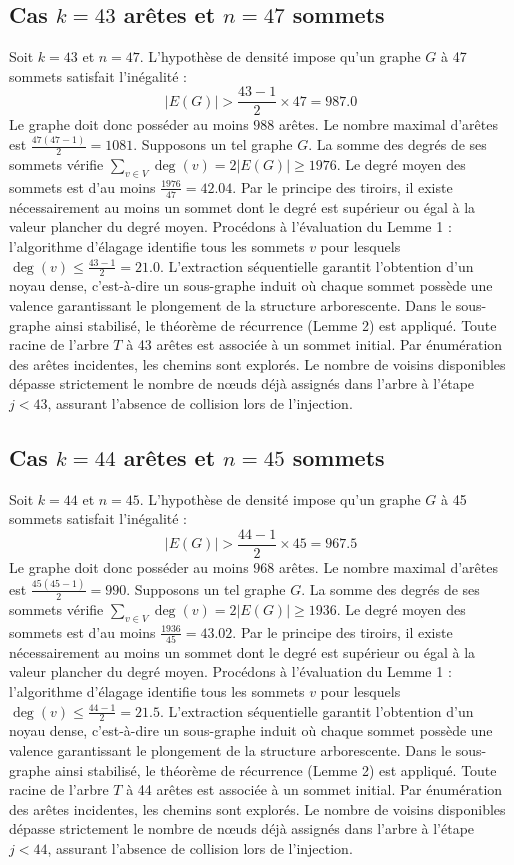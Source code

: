 \documentclass[12pt,a4paper]{article}
\begin{document}
\subsection{Cas $k = 43$ arêtes et $n = 47$ sommets}
Soit $k = 43$ et $n = 47$. L'hypothèse de densité impose qu'un graphe $G$ à 47 sommets satisfait l'inégalité :
$$ |E(G)| > \frac{43-1}{2} \times 47 = 987.0 $$
Le graphe doit donc posséder au moins $988$ arêtes. Le nombre maximal d'arêtes est $\frac{47(47-1)}{2} = 1081$.
Supposons un tel graphe $G$. La somme des degrés de ses sommets vérifie $\sum_{v \in V} \deg(v) = 2|E(G)| \geq 1976$.
Le degré moyen des sommets est d'au moins $\frac{1976}{47} = 42.04$.
Par le principe des tiroirs, il existe nécessairement au moins un sommet dont le degré est supérieur ou égal à la valeur plancher du degré moyen.
Procédons à l'évaluation du Lemme 1 : l'algorithme d'élagage identifie tous les sommets $v$ pour lesquels $\deg(v) \leq \frac{43-1}{2} = 21.0$.
L'extraction séquentielle garantit l'obtention d'un noyau dense, c'est-à-dire un sous-graphe induit où chaque sommet possède une valence garantissant le plongement de la structure arborescente.
Dans le sous-graphe ainsi stabilisé, le théorème de récurrence (Lemme 2) est appliqué. Toute racine de l'arbre $T$ à 43 arêtes est associée à un sommet initial. Par énumération des arêtes incidentes, les chemins sont explorés. Le nombre de voisins disponibles dépasse strictement le nombre de nœuds déjà assignés dans l'arbre à l'étape $j < 43$, assurant l'absence de collision lors de l'injection.

\subsection{Cas $k = 44$ arêtes et $n = 45$ sommets}
Soit $k = 44$ et $n = 45$. L'hypothèse de densité impose qu'un graphe $G$ à 45 sommets satisfait l'inégalité :
$$ |E(G)| > \frac{44-1}{2} \times 45 = 967.5 $$
Le graphe doit donc posséder au moins $968$ arêtes. Le nombre maximal d'arêtes est $\frac{45(45-1)}{2} = 990$.
Supposons un tel graphe $G$. La somme des degrés de ses sommets vérifie $\sum_{v \in V} \deg(v) = 2|E(G)| \geq 1936$.
Le degré moyen des sommets est d'au moins $\frac{1936}{45} = 43.02$.
Par le principe des tiroirs, il existe nécessairement au moins un sommet dont le degré est supérieur ou égal à la valeur plancher du degré moyen.
Procédons à l'évaluation du Lemme 1 : l'algorithme d'élagage identifie tous les sommets $v$ pour lesquels $\deg(v) \leq \frac{44-1}{2} = 21.5$.
L'extraction séquentielle garantit l'obtention d'un noyau dense, c'est-à-dire un sous-graphe induit où chaque sommet possède une valence garantissant le plongement de la structure arborescente.
Dans le sous-graphe ainsi stabilisé, le théorème de récurrence (Lemme 2) est appliqué. Toute racine de l'arbre $T$ à 44 arêtes est associée à un sommet initial. Par énumération des arêtes incidentes, les chemins sont explorés. Le nombre de voisins disponibles dépasse strictement le nombre de nœuds déjà assignés dans l'arbre à l'étape $j < 44$, assurant l'absence de collision lors de l'injection.
\end{document}
